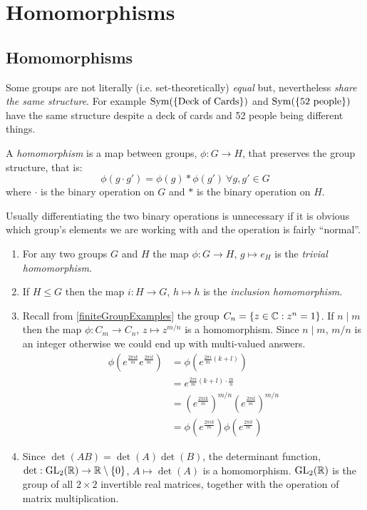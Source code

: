 \documentclass[../main.tex]{subfiles}
\begin{document}
\chapter{Homomorphisms}
\section{Homomorphisms}
Some groups are not literally (i.e. set-theoretically) \textit{equal} but, nevertheless \textit{share the same structure}.
For example $\operatorname{Sym}(\{\text{Deck of Cards}\})$ and $\operatorname{Sym}(\{\text{52 people}\})$ have the same structure despite a deck of cards and 52 people being different things.
\begin{definition}[Homomorphims]
  A \textit{homomorphism} is a map between groups, $\phi: G \to H$, that preserves the group structure, that is:
  \[
    \phi(g \cdot g') = \phi(g) * \phi(g')\ \forall g, g' \in G
  \]
  where $\cdot$ is the binary operation on $G$ and $*$ is the binary operation on $H$.
\end{definition}
\begin{remark}[Notation]
  Usually differentiating the two binary operations is unnecessary if it is obvious which group's elements we are working with and the operation is fairly ``normal''.
\end{remark}
\begin{example} \label{homExamples}
  \begin{enumerate}
    \item For any two groups $G$ and $H$ the map $\phi: G \to H$, $g \mapsto e_H$ is the \textit{trivial homomorphism}.
    \item If $H \leq G$ then the map $i: H \to G$, $h \mapsto h$ is the \textit{inclusion homomorphism}.
    \item Recall from \cref{finiteGroupExamples} the group $C_n = \{z \in \mathbb{C} : z^{n} = 1\}$.
          If $n \mid m$ then the map $\phi: C_m \to C_n$, $z \mapsto z^{m/n}$ is a homomorphism.
          Since $n \mid m$, $m/n$ is an integer otherwise we could end up with multi-valued answers.
          \begin{align*}
            \phi\left(e^{\frac{2\pi i k}{m}} e^{\frac{2 \pi i l}{m}}\right) &= \phi\left(e^{\frac{2\pi i}{m}(k + l)}\right) \\
                                                                            &= e^{\frac{2\pi i}{m}(k + l)\cdot \frac{m}{n}} \\
                                                                            &= \left(e^{\frac{2 \pi i k}{m}}\right)^{m/n} \left(e^{\frac{2 \pi i l}{m}}\right)^{m/n} \\
                                                                            &= \phi\left(e^{\frac{2\pi i k}{m}}\right) \phi\left(e^{\frac{2\pi i l}{m}}\right)
          \end{align*}
    \item Since $\det(AB) = \det(A)\det(B)$, the determinant function, $\det: \mathrm{GL}_2(\mathbb{R}) \to \mathbb{R} \setminus \{0\}$, $A \mapsto \det(A)$ is a homomorphism.
          $\mathrm{GL}_2(\mathbb{R})$ is the group of all $2\times2$ invertible real matrices, together with the operation of matrix multiplication.
  \end{enumerate}
\end{example}
\end{document}
